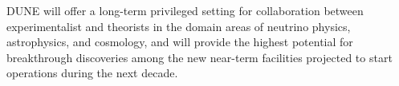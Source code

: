 DUNE will offer a long-term privileged setting for collaboration between experimentalist and theorists in the domain areas of neutrino physics, astrophysics, and cosmology, and will provide the highest potential for breakthrough discoveries among the new near-term facilities projected to start operations during the next decade.





